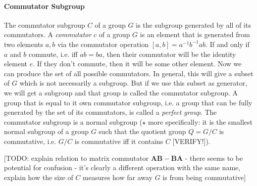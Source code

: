 

\paragraph{Commutator Subgroup} The commutator subgroup $C$ of a group $G$ is the subgroup generated by all of its commutators. A \emph{commutator} $c$ of a group $G$ is an element that is generated from two elements $a,b$ via the commutator operation $[a,b] = a^{-1} b^{-1} a b$. If and only if $a$ and $b$ commute, i.e. iff $ab = ba$, then their commutator will be the identity element $e$. If they don't commute, then it will be some other element. Now we can produce the set of all possible commutators. In general, this will give a subset of $G$ which is not necessarily a subgroup. But if we use this subset as generator, we will get a subgroup and that group is called the commutator subgroup. A group that is equal to it own commutator subgroup, i.e. a group that can be fully generated by the set of its commutators, is called a \emph{perfect group}. The commutator subgroup is a normal subgroup ($\star$ more specifically: it is the smallest normal subgroup of a group $G$ such that the quotient group $Q = G / C$ is commutative, i.e. $G/C$ is commutative iff it contains $C$ [VERIFY!]).


[TODO: explain relation to matrix commutator $\mathbf{AB - BA}$ - there seems to be potential for confusion - it's clearly a different operation with the same name, explain how the size of $C$ measures how far away $G$ is from being commutative]




